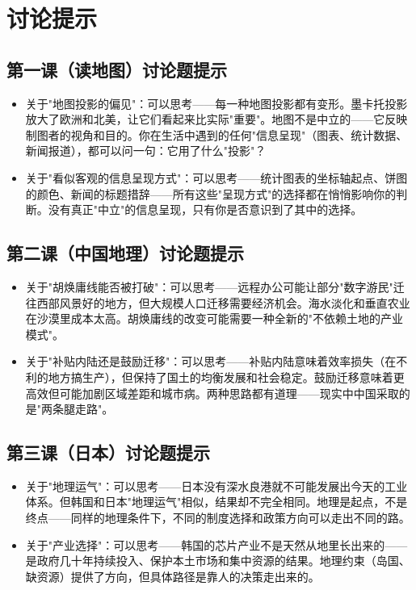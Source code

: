 \documentclass[a4paper,12pt]{ctexart}
\begin{document}
\section*{讨论提示}

\subsection*{第一课（读地图）讨论题提示}
\begin{itemize}
  \item 关于"地图投影的偏见"：可以思考——每一种地图投影都有变形。墨卡托投影放大了欧洲和北美，让它们看起来比实际"重要"。地图不是中立的——它反映制图者的视角和目的。你在生活中遇到的任何"信息呈现"（图表、统计数据、新闻报道），都可以问一句：它用了什么"投影"？
  \item 关于"看似客观的信息呈现方式"：可以思考——统计图表的坐标轴起点、饼图的颜色、新闻的标题措辞——所有这些"呈现方式"的选择都在悄悄影响你的判断。没有真正"中立"的信息呈现，只有你是否意识到了其中的选择。
\end{itemize}

\subsection*{第二课（中国地理）讨论题提示}
\begin{itemize}
  \item 关于"胡焕庸线能否被打破"：可以思考——远程办公可能让部分"数字游民"迁往西部风景好的地方，但大规模人口迁移需要经济机会。海水淡化和垂直农业在沙漠里成本太高。胡焕庸线的改变可能需要一种全新的"不依赖土地的产业模式"。
  \item 关于"补贴内陆还是鼓励迁移"：可以思考——补贴内陆意味着效率损失（在不利的地方搞生产），但保持了国土的均衡发展和社会稳定。鼓励迁移意味着更高效但可能加剧区域差距和城市病。两种思路都有道理——现实中中国采取的是"两条腿走路"。
\end{itemize}

\subsection*{第三课（日本）讨论题提示}
\begin{itemize}
  \item 关于"地理运气"：可以思考——日本没有深水良港就不可能发展出今天的工业体系。但韩国和日本"地理运气"相似，结果却不完全相同。地理是起点，不是终点——同样的地理条件下，不同的制度选择和政策方向可以走出不同的路。
  \item 关于"产业选择"：可以思考——韩国的芯片产业不是天然从地里长出来的——是政府几十年持续投入、保护本土市场和集中资源的结果。地理约束（岛国、缺资源）提供了方向，但具体路径是靠人的决策走出来的。
\end{itemize}
\end{document}

